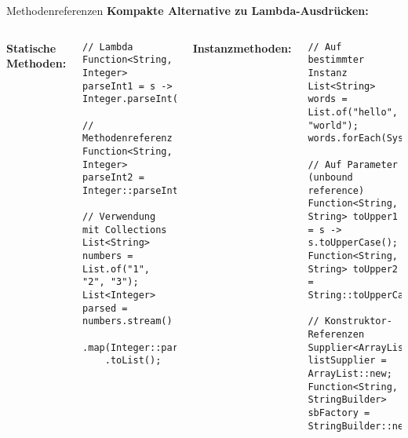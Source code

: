 \begin{frame}[fragile]{Methodenreferenzen}
  \textbf{Kompakte Alternative zu Lambda-Ausdrücken:}

  \begin{columns}[T]
    \textbf{Statische Methoden:}
    \begin{lstlisting}[style=java, basicstyle=\tiny\ttfamily]
// Lambda
Function<String, Integer> parseInt1 = s -> Integer.parseInt(s);

// Methodenreferenz
Function<String, Integer> parseInt2 = Integer::parseInt;

// Verwendung mit Collections
List<String> numbers = List.of("1", "2", "3");
List<Integer> parsed = numbers.stream()
    .map(Integer::parseInt)
    .toList();
    \end{lstlisting}

    \textbf{Instanzmethoden:}
    \begin{lstlisting}[style=java, basicstyle=\tiny\ttfamily]
// Auf bestimmter Instanz
List<String> words = List.of("hello", "world");
words.forEach(System.out::println);

// Auf Parameter (unbound reference)
Function<String, String> toUpper1 = s -> s.toUpperCase();
Function<String, String> toUpper2 = String::toUpperCase;

// Konstruktor-Referenzen
Supplier<ArrayList<String>> listSupplier = ArrayList::new;
Function<String, StringBuilder> sbFactory = StringBuilder::new;
    \end{lstlisting}
  \end{columns}
\end{frame}

